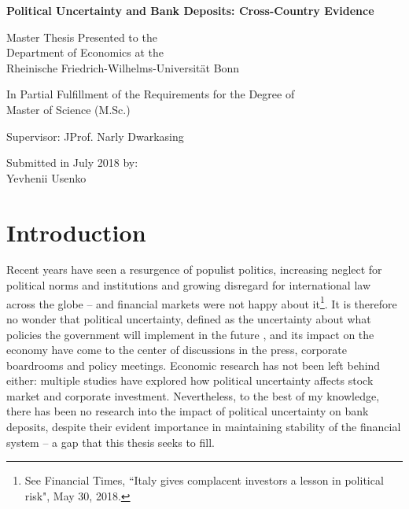 \documentclass[12pt,a4paper]{article}
\begin{document}
\begin{titlepage}
	\centering
	\vspace*{2cm}
	{\LARGE\bfseries Political Uncertainty and Bank Deposits: Cross-Country Evidence\par}
	\vspace{4cm}
	{\large Master Thesis Presented to the \\ Department of Economics at the \\ Rheinische Friedrich-Wilhelms-Universität Bonn\par}
	\vspace{1.5cm}
	{\large In Partial Fulfillment of the Requirements for the Degree of \\ Master of Science (M.Sc.)\par}
	\vspace{4cm}
	{\large Supervisor: JProf. Narly Dwarkasing\par}
	\vspace{2cm}
	{\large Submitted in July 2018 by: \\ Yevhenii Usenko \par}

\end{titlepage}

\tableofcontents

\clearpage
{}
\section{Introduction}
Recent years have seen a resurgence of populist politics, increasing neglect for political norms and institutions and growing disregard for international law across the globe -- and financial markets were not happy about it\footnote{See Financial Times, ``Italy gives complacent investors a lesson in political risk", May 30, 2018.}. It is therefore no wonder that political uncertainty, defined as the uncertainty about what policies the government will implement in the future \citep{pastor2012uncertainty, pastor2013political}, and its impact on the economy have come to the center of discussions in the press, corporate boardrooms and policy meetings. Economic research has not been left behind either: multiple studies have explored how political uncertainty affects stock market and corporate investment. Nevertheless, to the best of my knowledge, there has been no research into the impact of political uncertainty on bank deposits, despite their evident importance in maintaining stability of the financial system \citep{cull2012, han2013} -- a gap that this thesis seeks to fill.
\end{document}

